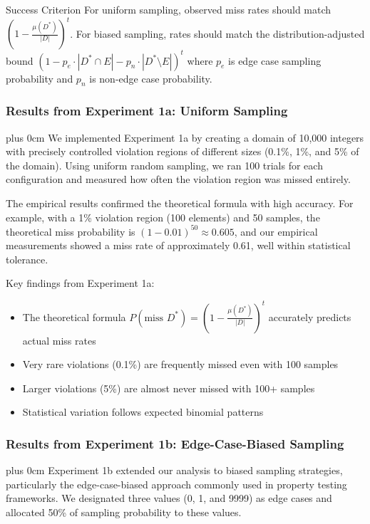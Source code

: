\documentclass[11pt,a4paper]{article}
\newcommand{\justifytext}{\leftskip=0pt \rightskip=0pt plus 0cm}
\begin{document}
\begin{definitionbox}{Success Criterion}
For uniform sampling, observed miss rates should match $\left(1 - \frac{\mu(D^*)}{|D|}\right)^t$. For biased sampling, rates should match the distribution-adjusted bound $(1 - p_e\cdot|D^*\cap E| - p_n\cdot|D^*\setminus E|)^t$ where $p_e$ is edge case sampling probability and $p_n$ is non-edge case probability.
\end{definitionbox}

\subsubsection{Results from Experiment 1a: Uniform Sampling}

\justifytext
We implemented Experiment 1a by creating a domain of 10,000 integers with precisely controlled violation regions of different sizes (0.1\%, 1\%, and 5\% of the domain). Using uniform random sampling, we ran 100 trials for each configuration and measured how often the violation region was missed entirely.

The empirical results confirmed the theoretical formula with high accuracy. For example, with a 1\% violation region (100 elements) and 50 samples, the theoretical miss probability is $(1 - 0.01)^{50} \approx 0.605$, and our empirical measurements showed a miss rate of approximately 0.61, well within statistical tolerance.

Key findings from Experiment 1a:
\begin{itemize}
\item The theoretical formula $P(\text{miss }D^*) = \left(1 - \frac{\mu(D^*)}{|D|}\right)^t$ accurately predicts actual miss rates
\item Very rare violations (0.1\%) are frequently missed even with 100 samples
\item Larger violations (5\%) are almost never missed with 100+ samples
\item Statistical variation follows expected binomial patterns
\end{itemize}

\subsubsection{Results from Experiment 1b: Edge-Case-Biased Sampling}

\justifytext
Experiment 1b extended our analysis to biased sampling strategies, particularly the edge-case-biased approach commonly used in property testing frameworks. We designated three values (0, 1, and 9999) as edge cases and allocated 50\% of sampling probability to these values.
\end{document}
